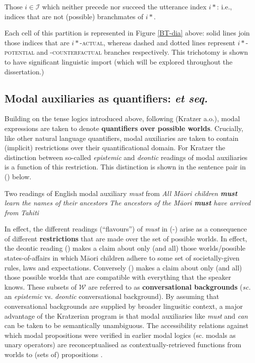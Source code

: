 \documentclass[12pt,dvipsnames]{report}
\begin{document}
Those $ i\in\mathcal I $ which neither precede nor succeed the utterance index $ i* $: i.e., indices that are not (possible) branchmates of $ i* $.

\xe

 Each cell of this partition is represented in Figure \ref{BT-dia} above: solid lines join those indices that are \textsc{$ i* $-actual}, whereas dashed and dotted lines represent \textsc{$ i* $-potential} and \textsc{-counterfactual} branches respectively. This trichotomy is shown to have significant linguistic import (which will be explored throughout the dissertation.)

\subsection{Modal auxiliaries as quantifiers: \citealt{Kratzer1977} \textit{et seq.}}\label{sec:kratzer}
 Building on the tense logics introduced above, following (Kratzer \citeyear{Kratzer1977,Kratzer1981,Kratzer1991} a.o.), modal expressions are taken to denote \textbf{quantifiers over possible worlds}. Crucially, like other natural language quantifiers, modal auxiliaries are taken to contain (implicit) restrictions over their quantificational domain. For Kratzer the distinction between so-called \textit{epistemic} and \textit{deontic} readings of modal auxiliaries is a function of this restriction. This distinction is shown in the sentence pair in () below.

\pex Two readings of English modal auxiliary \textit{must} from \citet[338]{Kratzer1977}
\a\textit{All Māori children \textbf{must} learn the names of their ancestors}
\a\textit{The ancestors of the Māori \textbf{must} have arrived from Tahiti}
\xe

In effect, the different readings (``flavours'') of \textit{must} in (-) arise as a consequence of different \textbf{restrictions} that are made over the set of possible worlds. In effect, the deontic reading () makes a claim about only (and all) those worlds/possible states-of-affairs in which Māori children adhere to some set of societally-given rules, laws and expectations. Conversely () makes a claim about only (and all) those possible worlds that are compatible with everything that the speaker knows. These subsets of $ \mathcal W$ are referred to as \textbf{conversational backgrounds} (\textit{sc.} an \textit{epistemic} vs. \textit{deontic} conversational background). By assuming that conversational backgrounds are supplied by broader lingusitic context, a major advantage of the Kratzerian program is that modal auxiliaries like \textit{must} and \textit{can} can be taken to be semantically unambiguous. The accessibility relations against which modal propositions were verified in earlier modal logics (sc. modals as unary operators) are reconceptualised as contextually-retrieved functions from worlds to (sets of) propositions \citep*[see][]{Kaufmann2006}. 
\end{document}
